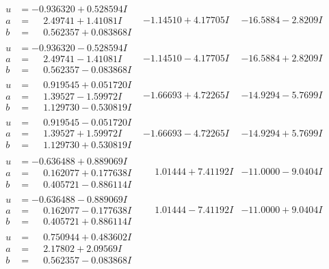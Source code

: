 \documentclass[1p]{elsarticle_modified}
\theoremstyle{definition}
\begin{document}
$$\begin{array}{c|c|c}
\begin{aligned}
u &= -0.936320 + 0.528594 I \\
a &= \phantom{-}2.49741 + 1.41081 I \\
b &= \phantom{-}0.562357 + 0.083868 I\end{aligned}
 & -1.14510 + 4.17705 I & -16.5884 - 2.8209 I \\ \hline\begin{aligned}
u &= -0.936320 - 0.528594 I \\
a &= \phantom{-}2.49741 - 1.41081 I \\
b &= \phantom{-}0.562357 - 0.083868 I\end{aligned}
 & -1.14510 - 4.17705 I & -16.5884 + 2.8209 I \\ \hline\begin{aligned}
u &= \phantom{-}0.919545 + 0.051720 I \\
a &= \phantom{-}1.39527 - 1.59972 I \\
b &= \phantom{-}1.129730 - 0.530819 I\end{aligned}
 & -1.66693 + 4.72265 I & -14.9294 - 5.7699 I \\ \hline\begin{aligned}
u &= \phantom{-}0.919545 - 0.051720 I \\
a &= \phantom{-}1.39527 + 1.59972 I \\
b &= \phantom{-}1.129730 + 0.530819 I\end{aligned}
 & -1.66693 - 4.72265 I & -14.9294 + 5.7699 I \\ \hline\begin{aligned}
u &= -0.636488 + 0.889069 I \\
a &= \phantom{-}0.162077 + 0.177638 I \\
b &= \phantom{-}0.405721 - 0.886114 I\end{aligned}
 & \phantom{-}1.01444 + 7.41192 I & -11.0000 - 9.0404 I \\ \hline\begin{aligned}
u &= -0.636488 - 0.889069 I \\
a &= \phantom{-}0.162077 - 0.177638 I \\
b &= \phantom{-}0.405721 + 0.886114 I\end{aligned}
 & \phantom{-}1.01444 - 7.41192 I & -11.0000 + 9.0404 I \\ \hline\begin{aligned}
u &= \phantom{-}0.750944 + 0.483602 I \\
a &= \phantom{-}2.17802 + 2.09569 I \\
b &= \phantom{-}0.562357 - 0.083868 I\end{aligned}

\end{array}$$
\end{document}
